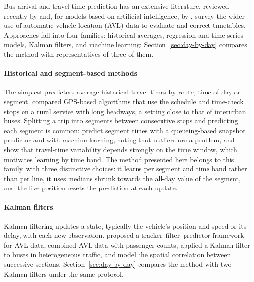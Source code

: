 
Bus arrival and travel-time prediction has an extensive literature, reviewed recently by \textcite{kumar2025review}
and, for models based on artificial intelligence, by \textcite{singh2022review}. \textcite{moreiramatias2015survey}
survey the wider use of automatic vehicle location (AVL) data to evaluate and correct timetables. Approaches fall into
four families: historical averages, regression and time-series models, Kalman filters, and machine learning;
Section~\ref{sec:day-by-day} compares the method with representatives of three of them.

\paragraph{Historical and segment-based methods} The simplest predictors average historical travel times by route,
time of day or segment. \textcite{lin1999experimental} compared GPS-based algorithms that use the schedule and
time-check stops on a rural service with long headways, a setting close to that of interurban buses. Splitting a trip
into segments between consecutive stops and predicting each segment is common: \textcite{gal2017journey} predict
segment times with a queueing-based snapshot predictor and with machine learning, noting that outliers are a problem,
and \textcite{mazloumi2010variability} show that travel-time variability depends strongly on the time window, which
motivates learning by time band. The method presented here belongs to this family, with three distinctive choices: it
learns per segment and time band rather than per line, it uses medians shrunk towards the all-day value of the
segment, and the live position resets the prediction at each update.

\paragraph{Kalman filters} Kalman filtering \parencite{kalman1960} updates a state, typically the vehicle's position
and speed or its delay, with each new observation. \textcite{cathey2003prescription} proposed a
tracker--filter--predictor framework for AVL data, \textcite{shalaby2004} combined AVL data with passenger counts,
\textcite{vanajakshi2009kalman} applied a Kalman filter to buses in heterogeneous traffic, and
\textcite{achar2020spatial} model the spatial correlation between successive sections.
Section~\ref{sec:day-by-day} compares the method with two Kalman filters under the same protocol.

